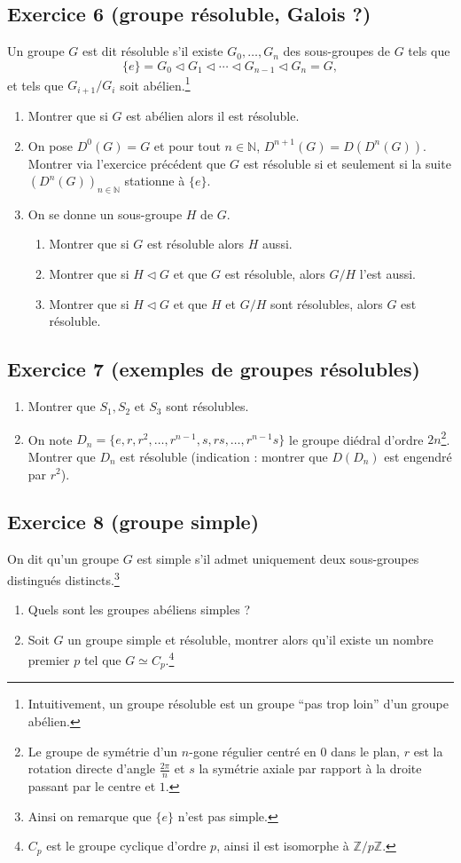 \documentclass[11pt,a4paper]{article}
\newcommand{\normal}{\mathrel{\triangleleft}}
\begin{document}
\subsection*{Exercice 6 (groupe résoluble, Galois ?)}
Un groupe $G$ est dit résoluble s'il existe $G_0,\ldots,G_n$ des sous-groupes de $G$ tels que
\[
  \{e\}=G_0\normal G_1\normal\cdots\normal G_{n-1}\normal G_n=G,
\]
et tels que $G_{i+1}/G_i$ soit abélien.\footnote{Intuitivement, un groupe résoluble est un groupe ``pas trop loin'' d'un groupe abélien.}
\begin{enumerate}
  \item Montrer que si $G$ est abélien alors il est résoluble.
  \item On pose $D^0(G)=G$ et pour tout $n\in\mathbb N$, $D^{n+1}(G)=D(D^n(G))$. Montrer via l'exercice précédent que $G$ est résoluble si et seulement si la suite $(D^n(G))_{n\in\mathbb N}$ stationne à $\{e\}$.
  \item On se donne un sous-groupe $H$ de $G$.
  \begin{enumerate}
    \item Montrer que si $G$ est résoluble alors $H$ aussi.
    \item Montrer que si $H\normal G$ et que $G$ est résoluble, alors $G/H$ l'est aussi.
    \item Montrer que si $H\normal G$ et que $H$ et $G/H$ sont résolubles, alors $G$ est résoluble.
  \end{enumerate}
\end{enumerate}

\subsection*{Exercice 7 (exemples de groupes résolubles)}
\begin{enumerate}
  \item Montrer que $S_1,S_2$ et $S_3$ sont résolubles.
  \item On note $D_n=\{e,r,r^2,\ldots,r^{n-1},s,rs,\ldots,r^{n-1}s\}$ le groupe diédral d'ordre $2n$\footnote{Le groupe de symétrie d'un $n$-gone régulier centré en $0$ dans le plan, $r$ est la rotation directe d'angle $\frac{2\pi}{n}$ et $s$ la symétrie axiale par rapport à la droite passant par le centre et $1$.}. Montrer que $D_n$ est résoluble (indication : montrer que $D(D_n)$ est engendré par $r^2$).
\end{enumerate}

\subsection*{Exercice 8 (groupe simple)}
On dit qu'un groupe $G$ est simple s'il admet uniquement deux sous-groupes distingués distincts.\footnote{Ainsi on remarque que $\{e\}$ n'est pas simple.}
\begin{enumerate}
  \item Quels sont les groupes abéliens simples ?
  \item Soit $G$ un groupe simple et résoluble, montrer alors qu'il existe un nombre premier $p$ tel que $G\simeq C_p$.\footnote{$C_p$ est le groupe cyclique d'ordre $p$, ainsi il est isomorphe à $\mathbb Z/p\mathbb Z$.}
\end{enumerate}
\end{document}
